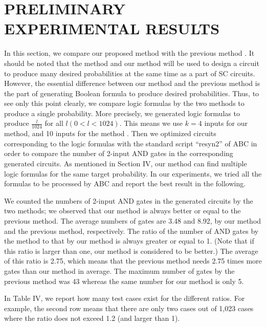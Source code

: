 \documentclass[10pt,conference]{IEEEtran}
\begin{document}
\section{PRELIMINARY EXPERIMENTAL RESULTS}
In this section, we compare our proposed method with the
previous method \cite{fifteen}. It should be noted that the method \cite{fifteen}
and our method will be used to design a circuit to produce
many desired probabilities at the same time as a part of SC
circuits. However, the essential difference between our method
and the previous method \cite{fifteen} is the part of generating Boolean
formula to produce desired probabilities. Thus, to see only this
point clearly, we compare logic formulas by the two methods
to produce a single probability. More precisely, we generated
logic formulas to produce $\frac{l}{1024}$ for all $l (0 < l< 1024)$. This
means we use $k = 4$ inputs for our method, and 10 inputs for
the method \cite{fifteen}. Then we optimized circuits corresponding
to the logic formulas with the standard script “resyn2” of
ABC \cite{five} in order to compare the number of 2-input AND
gates in the corresponding generated circuits. As mentioned
in Section IV, our method can find multiple logic formulas
for the same target probability. In our experiments, we tried
all the formulas to be processed by ABC and report the best
result in the following.

\par
We counted the numbers of 2-input AND gates in the
generated circuits by the two methods; we observed that our
method is always better or equal to the previous method. The
average numbers of gates are 3.48 and 8.92, by our method
and the previous method, respectively. The ratio of the number
of AND gates by the method \cite{fifteen} to that by our method is
always greater or equal to 1. (Note that if this ratio is larger
than one, our method is considered to be better.) The average
of this ratio is 2.75, which means that the previous method
needs 2.75 times more gates than our method in average. The
maximum number of gates by the previous method was 43
whereas the same number for our method is only 5.

\par
In Table IV, we report how many test cases exist for the
different ratios. For example, the second row means that there
are only two cases out of 1,023 cases where the ratio does not
exceed 1.2 (and larger than 1).
\end{document}
